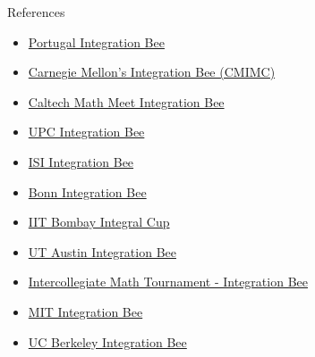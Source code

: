 \documentclass[12pt]{exam}
\begin{document}
\pagebreak
\begin{center}
  {\fontsize{30pt}{26pt}\selectfont References
  }
\end{center}
\vspace{1cm}
\begin{itemize}
    \item \href{https://www.nmath.pt/eventos/integration-bee-2025}{Portugal Integration Bee}
    \item \href{https://cmimc.math.cmu.edu/math/past-problems}{Carnegie Mellon's Integration Bee (CMIMC)}
    \item \href{https://www.caltechmathmeet.org/problems/cmm-2025-problems}{Caltech Math Meet Integration Bee}
    \item \href{https://espaiestudiantat.cfis.upc.edu/ca/integration-bee/historic}{UPC Integration Bee}
    \item \href{https://www.integrationfest.in/intbee/}{ISI Integration Bee}
    \item \href{https://bibee.rocks/}{Bonn Integration Bee}
    \item \href{https://www.theintegralcup.in/last-edition}{IIT Bombay Integral Cup}
    \item \href{https://oden.utexas.edu/news-and-events/events/2266---/}{UT Austin Integration Bee}
    \item \href{https://intercollegiatemathtournament.org/}{Intercollegiate Math Tournament - Integration Bee} 
    \item \href{https://math.mit.edu/~yyao1/integrationbee.html}{MIT Integration Bee}
    \item \href{https://artofproblemsolving.com/community/q1h3026499p27219178}{UC Berkeley Integration Bee}
\end{itemize}
\end{document}
